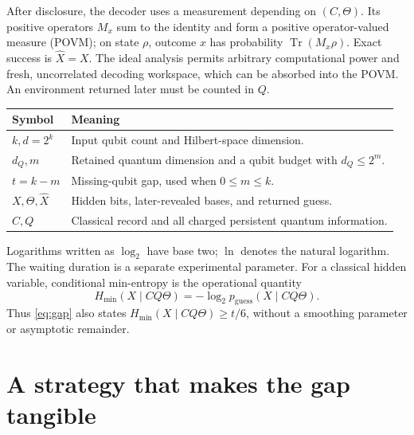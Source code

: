 \documentclass[11pt,a4paper]{article}
\newcommand{\Tr}{\operatorname{Tr}}
\newcommand{\pguess}{p_{\mathrm{guess}}}
\newcommand{\newsection}[1]{\section{#1}}
\begin{document}
After disclosure, the decoder uses a measurement depending on $(C,\Theta)$. Its positive operators $M_x$ sum to the identity and form a positive operator-valued measure (POVM); on state $\rho$, outcome $x$ has probability $\Tr(M_x\rho)$. Exact success is $\widehat X=X$. The ideal analysis permits arbitrary computational power and fresh, uncorrelated decoding workspace, which can be absorbed into the POVM. An environment returned later must be counted in $Q$.

\begin{center}\small
\begin{tabularx}{\linewidth}{@{}lX@{}}\toprule
Symbol & Meaning \\\midrule
$k,d=2^k$ & Input qubit count and Hilbert-space dimension.\\
$d_Q,m$ & Retained quantum dimension and a qubit budget with $d_Q\leq2^m$.\\
$t=k-m$ & Missing-qubit gap, used when $0\leq m\leq k$.\\
$X,\Theta,\widehat X$ & Hidden bits, later-revealed bases, and returned guess.\\
$C,Q$ & Classical record and all charged persistent quantum information.\\
\bottomrule\end{tabularx}\end{center}
Logarithms written as $\log_2$ have base two; $\ln$ denotes the natural logarithm. The waiting duration is a separate experimental parameter. For a classical hidden variable, conditional min-entropy is the operational quantity
\[
H_{\min}(X\mid CQ\Theta)=-\log_2\pguess(X\mid CQ\Theta).
\]
Thus \eqref{eq:gap} also states $H_{\min}(X\mid CQ\Theta)\geq t/6$, without a smoothing parameter or asymptotic remainder.

\newsection{A strategy that makes the gap tangible}
\end{document}
